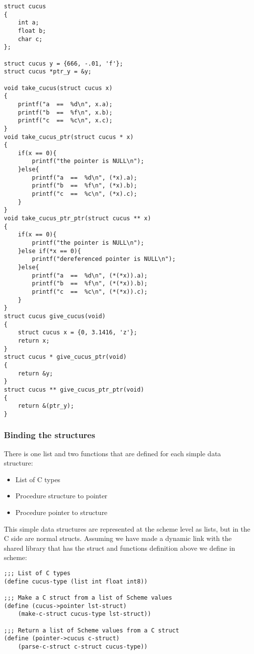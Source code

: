 \documentclass[latterpaper, leqno]{article}
\begin{document}
\begin{verbatim}
struct cucus
{
    int a;
    float b;
    char c;
};

struct cucus y = {666, -.01, 'f'};
struct cucus *ptr_y = &y;

void take_cucus(struct cucus x)
{
    printf("a  ==  %d\n", x.a);
    printf("b  ==  %f\n", x.b);
    printf("c  ==  %c\n", x.c);
}
void take_cucus_ptr(struct cucus * x)
{
    if(x == 0){
        printf("the pointer is NULL\n");
    }else{
        printf("a  ==  %d\n", (*x).a);
        printf("b  ==  %f\n", (*x).b);
        printf("c  ==  %c\n", (*x).c);
    }
}
void take_cucus_ptr_ptr(struct cucus ** x)
{
    if(x == 0){
        printf("the pointer is NULL\n");
    }else if(*x == 0){
        printf("dereferenced pointer is NULL\n");
    }else{
        printf("a  ==  %d\n", (*(*x)).a);
        printf("b  ==  %f\n", (*(*x)).b);
        printf("c  ==  %c\n", (*(*x)).c);
    }
}
struct cucus give_cucus(void)
{
    struct cucus x = {0, 3.1416, 'z'};
    return x;
}
struct cucus * give_cucus_ptr(void)
{
    return &y;
}
struct cucus ** give_cucus_ptr_ptr(void)
{
    return &(ptr_y);
}
\end{verbatim}

\subsubsection*{Binding the structures}
There is one list and two functions that are defined for each simple data structure:
\begin{itemize}
  \item List of C types
  \item Procedure structure to pointer
  \item Procedure pointer to structure
\end{itemize}

This simple data structures are represented at the scheme level as lists, but in the C side are normal structs. Assuming we have made a dynamic link with the shared library that has the struct and functions definition above we define in scheme:

\begin{verbatim}
;;; List of C types
(define cucus-type (list int float int8))

;;; Make a C struct from a list of Scheme values
(define (cucus->pointer lst-struct)
    (make-c-struct cucus-type lst-struct))

;;; Return a list of Scheme values from a C struct
(define (pointer->cucus c-struct)
    (parse-c-struct c-struct cucus-type))
\end{verbatim}
\end{document}

